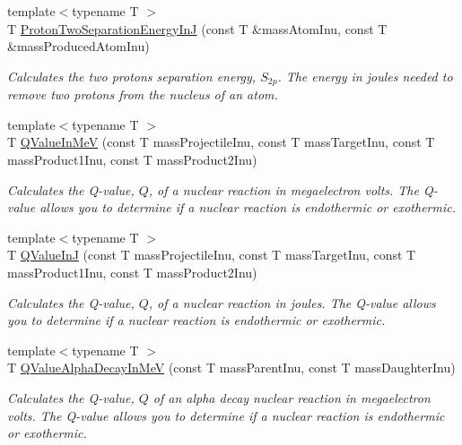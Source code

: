 \begin{DoxyCompactItemize}
{\footnotesize template$<$typename T $>$ }\\T \mbox{\hyperlink{group___e_g_x_phys-_nuclear_separation_energy_gad7c1d4a32daa8aaa53c5fce37c421f82}{Proton\+Two\+Separation\+Energy\+InJ}} (const T \&mass\+Atom\+Inu, const T \&mass\+Produced\+Atom\+Inu)
\begin{DoxyCompactList}\small\item\em Calculates the two protons separation energy, $S_{2p}$. The energy in joules needed to remove two protons from the nucleus of an atom. \end{DoxyCompactList}\item 
{\footnotesize template$<$typename T $>$ }\\T \mbox{\hyperlink{group___e_g_x_phys-_q_value_gab96ade2d74f5303e30a43ff97bd03841}{Q\+Value\+In\+MeV}} (const T mass\+Projectile\+Inu, const T mass\+Target\+Inu, const T mass\+Product1\+Inu, const T mass\+Product2\+Inu)
\begin{DoxyCompactList}\small\item\em Calculates the Q-\/value, $Q$, of a nuclear reaction in megaelectron volts. The Q-\/value allows you to determine if a nuclear reaction is endothermic or exothermic. \end{DoxyCompactList}\item 
{\footnotesize template$<$typename T $>$ }\\T \mbox{\hyperlink{group___e_g_x_phys-_q_value_ga4b23be4fb0a3a9e7229c95377afc74b5}{Q\+Value\+InJ}} (const T mass\+Projectile\+Inu, const T mass\+Target\+Inu, const T mass\+Product1\+Inu, const T mass\+Product2\+Inu)
\begin{DoxyCompactList}\small\item\em Calculates the Q-\/value, $Q$, of a nuclear reaction in joules. The Q-\/value allows you to determine if a nuclear reaction is endothermic or exothermic. \end{DoxyCompactList}\item 
{\footnotesize template$<$typename T $>$ }\\T \mbox{\hyperlink{group___e_g_x_phys-_q_value-_alpha_ga4f9a38d3ad4bf93471a0affb493b6e72}{Q\+Value\+Alpha\+Decay\+In\+MeV}} (const T mass\+Parent\+Inu, const T mass\+Daughter\+Inu)
\begin{DoxyCompactList}\small\item\em Calculates the Q-\/value, $Q$ of an alpha decay nuclear reaction in megaelectron volts. The Q-\/value allows you to determine if a nuclear reaction is endothermic or exothermic. \end{DoxyCompactList}\item 

\end{DoxyCompactItemize}
